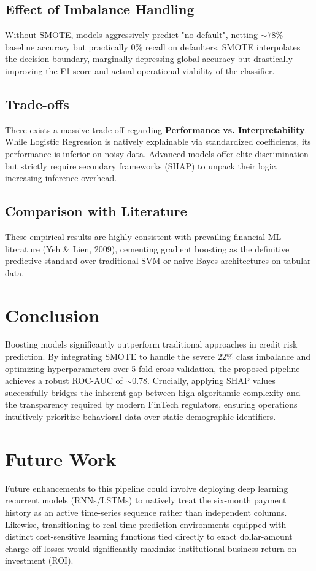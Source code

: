 \documentclass[12pt,a4paper]{article}
\begin{document}
\subsection{Effect of Imbalance Handling}
Without SMOTE, models aggressively predict "no default", netting $\sim 78\%$ baseline accuracy but practically $0\%$ recall on defaulters. SMOTE interpolates the decision boundary, marginally depressing global accuracy but drastically improving the F1-score and actual operational viability of the classifier.

\subsection{Trade-offs}
There exists a massive trade-off regarding \textbf{Performance vs. Interpretability}. While Logistic Regression is natively explainable via standardized coefficients, its performance is inferior on noisy data. Advanced models offer elite discrimination but strictly require secondary frameworks (SHAP) to unpack their logic, increasing inference overhead.

\subsection{Comparison with Literature}
These empirical results are highly consistent with prevailing financial ML literature (Yeh \& Lien, 2009), cementing gradient boosting as the definitive predictive standard over traditional SVM or naive Bayes architectures on tabular data.

\section{Conclusion}
Boosting models significantly outperform traditional approaches in credit risk prediction. By integrating SMOTE to handle the severe $22\%$ class imbalance and optimizing hyperparameters over 5-fold cross-validation, the proposed pipeline achieves a robust ROC-AUC of $\sim 0.78$. Crucially, applying SHAP values successfully bridges the inherent gap between high algorithmic complexity and the transparency required by modern FinTech regulators, ensuring operations intuitively prioritize behavioral data over static demographic identifiers.

\section{Future Work}
Future enhancements to this pipeline could involve deploying deep learning recurrent models (RNNs/LSTMs) to natively treat the six-month payment history as an active time-series sequence rather than independent columns. Likewise, transitioning to real-time prediction environments equipped with distinct cost-sensitive learning functions tied directly to exact dollar-amount charge-off losses would significantly maximize institutional business return-on-investment (ROI).
\end{document}
